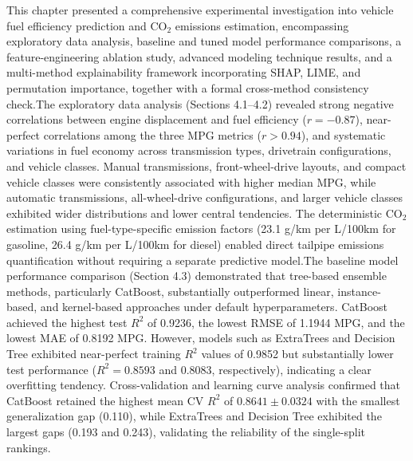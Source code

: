 This chapter presented a comprehensive experimental investigation into vehicle fuel efficiency prediction and \(\mathrm{CO_2}\) emissions estimation, encompassing exploratory data analysis, baseline and tuned model performance comparisons, a feature-engineering ablation study, advanced modeling technique results, and a multi-method explainability framework incorporating SHAP, LIME, and permutation importance, together with a formal cross-method consistency check.The exploratory data analysis (Sections 4.1–4.2) revealed strong negative correlations between engine displacement and fuel efficiency (\(r = -0.87\)), near-perfect correlations among the three MPG metrics (\(r > 0.94\)), and systematic variations in fuel economy across transmission types, drivetrain configurations, and vehicle classes. Manual transmissions, front-wheel-drive layouts, and compact vehicle classes were consistently associated with higher median MPG, while automatic transmissions, all-wheel-drive configurations, and larger vehicle classes exhibited wider distributions and lower central tendencies. The deterministic \(\mathrm{CO_2}\) estimation using fuel-type-specific emission factors (23.1 g/km per L/100km for gasoline, 26.4 g/km per L/100km for diesel) enabled direct tailpipe emissions quantification without requiring a separate predictive model.The baseline model performance comparison (Section 4.3) demonstrated that tree-based ensemble methods, particularly CatBoost, substantially outperformed linear, instance-based, and kernel-based approaches under default hyperparameters. CatBoost achieved the highest test \(R^2\) of 0.9236, the lowest RMSE of 1.1944 MPG, and the lowest MAE of 0.8192 MPG. However, models such as ExtraTrees and Decision Tree exhibited near-perfect training \(R^2\) values of 0.9852 but substantially lower test performance (\(R^2 = 0.8593\) and 0.8083, respectively), indicating a clear overfitting tendency. Cross-validation and learning curve analysis confirmed that CatBoost retained the highest mean CV \(R^2\) of \(0.8641 \pm 0.0324\) with the smallest generalization gap (0.110), while ExtraTrees and Decision Tree exhibited the largest gaps (0.193 and 0.243), validating the reliability of the single-split rankings.
